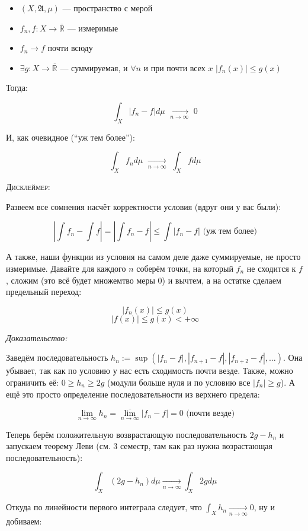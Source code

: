 \documentclass{article}
\def\dbl{\,\,}
\def\rinf{\overline{\mathbb{R}}}
\def\goesto#1{\underset{#1}{\longrightarrow}}
\def\toinf#1{\goesto{#1 \rightarrow \infty}}
\def\ntoinf{\toinf{n}}
\begin{document}
\begin{itemize}
    \item $(X, \mathfrak{A}, \mu)$ --- пространство с мерой
    \item $f_n, f: X \rightarrow \rinf$ --- измеримые
    \item $f_n \rightarrow f$ почти всюду
    \item $\exists g: X \rightarrow \rinf$ --- суммируемая, и $\forall n$ и при почти всех $x \dbl |f_n(x)| \le g(x)$
\end{itemize}

Тогда:

\[\int_{X}|f_n - f| d \mu \dbl \ntoinf \dbl 0\]

И, как очевидное (``уж тем более''):

\[\int_{X} f_n d\mu \dbl \ntoinf \dbl \int_{X} f d\mu\]


\textsc{Дисклеймер:}

Развеем все сомнения насчёт корректности условия (вдруг они у вас были):

\[\left| \int f_n - \int f \right| = \left| \int f_n - f \right| \le \int |f_n - f| \text{ (уж тем более)}\]

А также, наши функции из условия на самом деле даже суммируемые, не просто измеримые. Давайте для каждого $n$ соберём точки, на который $f_n$ не сходится к $f$, сложим (это всё будет множемтво меры 0) и вычтем, а на остатке сделаем предельный переход:

\[|f_n(x)| \le g(x)\]
\[|f(x)| \le g(x) < +\infty\]

\textit{Доказательство:}

Заведём последовательность $h_n := \sup (|f_n - f|, |f_{n + 1} - f|, |f_{n + 2} - f|, \ldots)$. Она убывает, так как по условию у нас есть сходимость почти везде. Также, можно ограничить её: $0 \ge h_n \ge 2 g$ (модули больше нуля и по условию все $|f_n| \ge g$). А ещё это просто определение последовательности из верхнего предела:

\[\lim_{n \rightarrow \infty} h_n = \overline{\lim_{n \rightarrow \infty}} |f_n - f| = 0 \text{ (почти везде)}\]

Теперь берём положительную возврастающую последовательность $2g - h_n$ и запускаем теорему Леви (см. 3 семестр, там как раз нужна возрастающая последовательность):

\[\int_{X} (2g - h_n) d\mu \ntoinf \int_{X} 2g d\mu\]

Откуда по линейности первого интеграла следует, что $\int_{X} h_n \ntoinf 0$, ну и добиваем:
\end{document}
